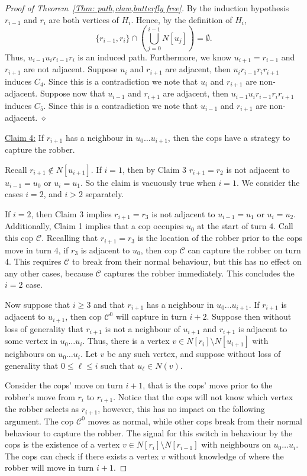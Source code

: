 \documentclass[12pt]{article}
\theoremstyle{definition}
\begin{document}
\begin{proof}[Proof of Theorem~\ref{Thm: path,claw,butterfly free}]
By the induction hypothesis $r_{i-1}$ and $r_i$ are both vertices of $H_i$.
Hence, by the definition of $H_i$,
\[
\{r_{i-1},r_i\} \cap \left(\bigcup_{j=0}^{i-1} N[u_j] \right) = \emptyset.
\]
Thus, $u_{i-1}u_{i}r_{i-1}r_i$ is an induced path.
Furthermore, we know $u_{i+1} = r_{i-1}$ and $r_{i+1}$ are not adjacent.
Suppose $u_{i}$ and $r_{i+1}$ are adjacent, then $u_ir_{i-1}r_ir_{i+1}$ induces $C_4$.
Since this is a contradiction we note that $u_{i}$ and $r_{i+1}$ are non-adjacent.
Suppose now that  $u_{i-1}$ and $r_{i+1}$ are adjacent, then $u_{i-1}u_ir_{i-1}r_ir_{i+1}$ induces $C_5$.
Since this is a contradiction we note that $u_{i-1}$ and $r_{i+1}$ are non-adjacent.
\hfill $\diamond$
\vspace{0.5cm}


\vspace{0.25cm}
\noindent\underline{Claim 4:} If $r_{i+1}$ has a neighbour in $u_0\dots u_{i+1}$, 
then the cops have a strategy to capture the robber. 
\vspace{0.25cm}


Recall $r_{i+1} \notin N[u_{i+1}]$.
If $i=1$, then by Claim 3 $r_{i+1} = r_2$ is not adjacent to $u_{i-1} = u_0$ or $u_{i}= u_1$.
So the claim is vacuously true when $i = 1$.
We consider the cases $i = 2$, and $i>2$ separately.

If $i = 2$, then Claim 3 implies $r_{i+1} = r_3$ is not adjacent to $u_{i-1} = u_1$ or $u_{i}= u_2$.
Additionally, Claim 1 implies that a cop occupies $u_0$ at the start of turn $4$.
Call this cop $\mathcal{C}$.
Recalling that $r_{i+1} = r_3$ is the location of the robber prior to the cops move in turn $4$,
if $r_3$ is adjacent to $u_0$, then cop $\mathcal{C}$ can capture the robber on turn $4$.
This requires $\mathcal{C}$ to break from their normal behaviour,
but this has no effect on any other cases, because $\mathcal{C}$ captures the robber immediately.
This concludes the $i=2$ case.


Now suppose that $i\geq 3$ and that $r_{i+1}$ has a neighbour in $u_0\dots u_{i+1}$.
If $r_{i+1}$ is adjacent to $u_{i+1}$, then cop $\mathcal{C}^0$ will capture in turn $i+2$.
Suppose then without loss of generality that $r_{i+1}$ is not a neighbour of $u_{i+1}$ and $r_{i+1}$ is adjacent to some vertex in  $u_0\dots u_{i}$.
Thus, there is a vertex $v \in N[r_i]\setminus N[u_{i+1}]$ with neighbours on  $u_0\dots u_i$.
Let $v$ be any such vertex,
and suppose without loss of generality
that $0 \leq \ell \leq i$ such that $u_\ell \in N(v)$.

Consider the cops' move on turn $i+1$, that is the cops' move prior to the robber's move from $r_i$ to $r_{i+1}$.
Notice that the cops will not know which vertex the robber selects as $r_{i+1}$, 
however, this has no impact on the following argument.
The cop $\mathcal{C}^0$ moves as normal, while other cops break from their normal behaviour to capture the robber.
The signal for this switch in behaviour by the cops is the existence of a vertex 
$v \in N[r_i]\setminus N[r_{i-1}]$ with neighbours on  $u_0\dots u_i$.
The cops can check if there exists a vertex $v$
without knowledge of where the robber will move in turn $i+1$.



\end{proof}
\end{document}
